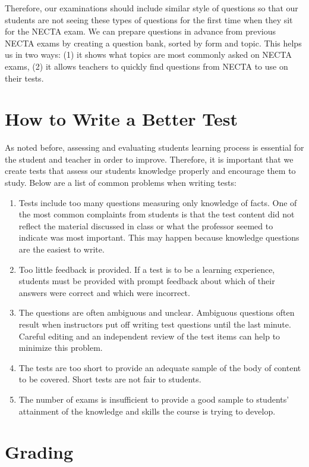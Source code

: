 Therefore, our examinations should include similar style of questions so that our students are not seeing these types of questions for the first time when they sit for the NECTA exam.   We can prepare questions in advance from previous NECTA exams by creating a question bank, sorted by form and topic.  This helps us in two ways: (1) it shows what topics are most commonly asked on NECTA exams, (2) it allows teachers to quickly find questions from NECTA to use on their tests. 

\section{How to Write a Better Test}

As noted before, assessing and evaluating students learning process is essential for the student and teacher in order to improve.  Therefore, it is important that we create tests that assess our students knowledge properly and encourage them to study. Below are a list of common problems when writing tests:

\begin{enumerate}
 \item Tests include too many questions measuring only knowledge of facts. One of the most common complaints from students is that the test content did not reflect the material discussed in class or what the professor seemed to indicate was most important. This may happen because knowledge questions are the easiest to write.
 \item Too little feedback is provided. If a test is to be a learning experience, students must be provided with prompt feedback about which of their answers were correct and which were incorrect.
 \item The questions are often ambiguous and unclear.  Ambiguous questions often result when instructors put off writing test questions until the last minute. Careful editing and an independent review of the test items can help to minimize this problem.
 \item The tests are too short to provide an adequate sample of the body of content to be covered. Short tests are not fair to students.
 \item The number of exams is insufficient to provide a good sample to students' attainment of the knowledge and skills the course is trying to develop. 
\end{enumerate}

\section{Grading}

